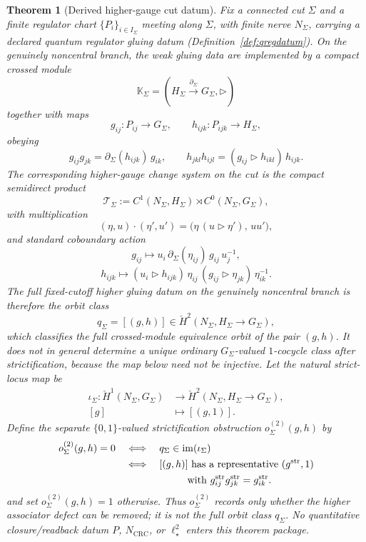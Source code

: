 \documentclass[11pt]{article}
\newtheorem{theorem}{Theorem}[section]
\begin{document}
\begin{theorem}[Derived higher-gauge cut datum]\label{thm:hgdatum}
Fix a connected cut \(\Sigma\) and a finite regulator chart \(\{P_i\}_{i\in I_\Sigma}\) meeting along \(\Sigma\), with finite nerve \(N_\Sigma\), carrying a declared quantum regulator gluing datum (Definition~\ref{def:qregdatum}). On the genuinely noncentral branch, the weak gluing data are implemented by a compact crossed module
\[
\mathbb K_\Sigma=(H_\Sigma\xrightarrow{\partial_\Sigma}G_\Sigma,\triangleright)
\]
together with maps
\[
g_{ij}:P_{ij}\to G_\Sigma,
\qquad
h_{ijk}:P_{ijk}\to H_\Sigma,
\]
obeying
\[
g_{ij}g_{jk}=\partial_\Sigma(h_{ijk})\,g_{ik},
\qquad
h_{jkl}h_{ijl}=(g_{ij}\triangleright h_{ikl})\,h_{ijk}.
\]
The corresponding higher-gauge change system on the cut is the compact semidirect product
\[
\mathcal T_\Sigma:=C^1(N_\Sigma,H_\Sigma)\rtimes C^0(N_\Sigma,G_\Sigma),
\]
with multiplication
\[
(\eta,u)\cdot(\eta',u')
=
\bigl(\eta\,(u\triangleright \eta'),\,uu'\bigr),
\]
and standard coboundary action
\[
g_{ij}\mapsto u_i\,\partial_\Sigma(\eta_{ij})\,g_{ij}\,u_j^{-1},
\]
\[
h_{ijk}\mapsto
(u_i\triangleright h_{ijk})\,
\eta_{ij}\,
(g_{ij}\triangleright \eta_{jk})\,
\eta_{ik}^{-1}.
\]
The full fixed-cutoff higher gluing datum on the genuinely noncentral branch is therefore the orbit class
\[
q_\Sigma=[(g,h)]\in \check H^2(N_\Sigma,H_\Sigma\to G_\Sigma),
\]
which classifies the full crossed-module equivalence orbit of the pair \((g,h)\). It does not in
general determine a unique ordinary \(G_\Sigma\)-valued \(1\)-cocycle class after strictification,
because the map below need not be injective.
Let the natural strict-locus map be
\[
\begin{aligned}
\iota_\Sigma:\check H^1(N_\Sigma,G_\Sigma)
&\longrightarrow \check H^2(N_\Sigma,H_\Sigma\to G_\Sigma),\\
[g]&\longmapsto[(g,1)].
\end{aligned}
\]
Define the separate \(\{0,1\}\)-valued strictification obstruction \(o^{(2)}_\Sigma(g,h)\) by
\[
\begin{aligned}
o^{(2)}_\Sigma(g,h)=0
&\quad\Longleftrightarrow\quad q_\Sigma\in\operatorname{im}(\iota_\Sigma)\\
&\quad\Longleftrightarrow\quad [(g,h)]\text{ has a representative }(g^{\mathrm{str}},1)\\
&\hspace{7.2em}\text{with }g^{\mathrm{str}}_{ij}g^{\mathrm{str}}_{jk}=g^{\mathrm{str}}_{ik}.
\end{aligned}
\]
and set \(o^{(2)}_\Sigma(g,h)=1\) otherwise.
Thus \(o^{(2)}_\Sigma\) records only whether the higher associator defect can be removed; it is
not the full orbit class \(q_\Sigma\). No quantitative closure/readback datum \(P\),
\(N_{\mathrm{CRC}}\), or \(\ell_\star^2\) enters
this theorem package.
\end{theorem}
\end{document}
